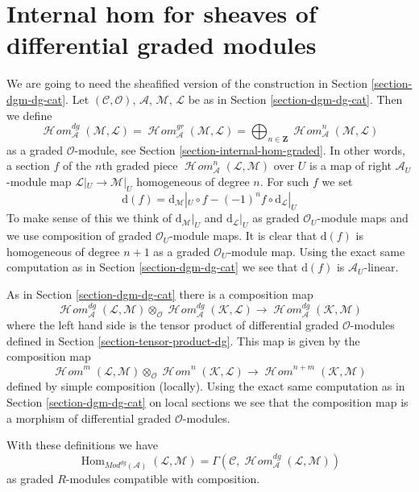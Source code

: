 \documentclass{stacks-project}
\theoremstyle{plain}
\theoremstyle{definition}
\theoremstyle{remark}
\numberwithin{equation}{subsection}
\def\Hom{\mathop{\mathrm{Hom}}\nolimits}
\def\SheafHom{\mathop{\mathcal{H}\!\mathit{om}}\nolimits}
\begin{document}
\section{Internal hom for sheaves of differential graded modules}
\label{section-internal-hom-dg}

\noindent
We are going to need the sheafified version of the construction
in Section \ref{section-dgm-dg-cat}.
Let $(\mathcal{C}, \mathcal{O})$, $\mathcal{A}$,
$\mathcal{M}$, $\mathcal{L}$ be as in Section \ref{section-dgm-dg-cat}.
Then we define
$$
\SheafHom^{dg}_\mathcal{A}(\mathcal{M}, \mathcal{L}) =
\SheafHom^{gr}_\mathcal{A}(\mathcal{M}, \mathcal{L}) =
\bigoplus\nolimits_{n \in \mathbf{Z}}
\SheafHom^n_\mathcal{A}(\mathcal{M}, \mathcal{L})
$$
as a graded $\mathcal{O}$-module, see
Section \ref{section-internal-hom-graded}.
In other words, a section $f$ of the $n$th graded piece
$\SheafHom^n_\mathcal{A}(\mathcal{L}, \mathcal{M})$ over $U$
is a map of right $\mathcal{A}_U$-module map
$\mathcal{L}|_U \to \mathcal{M}|_U$ homogeneous of degree $n$.
For such $f$ we set
$$
\text{d}(f) =
\text{d}_\mathcal{M}|_U \circ f - (-1)^n f \circ \text{d}_\mathcal{L}|_U
$$
To make sense of this we think of $\text{d}_\mathcal{M}|_U$ and
$\text{d}_\mathcal{L}|_U$ as graded $\mathcal{O}_U$-module maps and
we use composition of graded $\mathcal{O}_U$-module maps.
It is clear that $\text{d}(f)$ is homogeneous of
degree $n + 1$ as a graded $\mathcal{O}_U$-module map.
Using the exact same computation as in Section \ref{section-dgm-dg-cat}
we see that $\text{d}(f)$ is $\mathcal{A}_U$-linear.

\medskip\noindent
As in Section \ref{section-dgm-dg-cat} there is a composition map
$$
\SheafHom^{dg}_\mathcal{A}(\mathcal{L}, \mathcal{M}) \otimes_\mathcal{O}
\SheafHom^{dg}_\mathcal{A}(\mathcal{K}, \mathcal{L})
\longrightarrow
\SheafHom^{dg}_\mathcal{A}(\mathcal{K}, \mathcal{M})
$$
where the left hand side is the tensor product of
differential graded $\mathcal{O}$-modules
defined in Section \ref{section-tensor-product-dg}. This map
is given by the composition map
$$
\SheafHom^m(\mathcal{L}, \mathcal{M}) \otimes_\mathcal{O}
\SheafHom^n(\mathcal{K}, \mathcal{L}) \longrightarrow
\SheafHom^{n + m}(\mathcal{K}, \mathcal{M})
$$
defined by simple composition (locally). Using the exact same
computation as in Section \ref{section-dgm-dg-cat} on local sections
we see that the composition map is a morphism of differential
graded $\mathcal{O}$-modules.

\medskip\noindent
With these definitions we have
$$
\Hom_{\textit{Mod}^{dg}(\mathcal{A})}(\mathcal{L}, \mathcal{M}) =
\Gamma(\mathcal{C}, \SheafHom^{dg}_\mathcal{A}(\mathcal{L}, \mathcal{M}))
$$
as graded $R$-modules compatible with composition.
\end{document}
